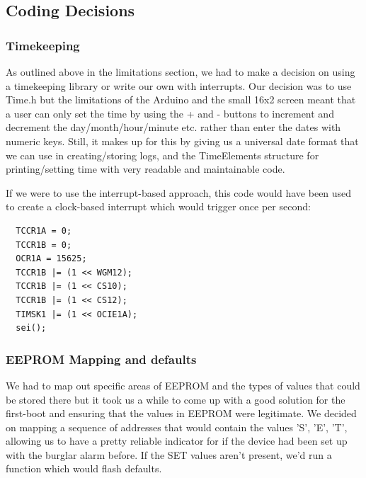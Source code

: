 \documentclass[a4paper,11pt]{article}
\theoremstyle{mytheor}
\begin{document}
\subsection{Coding Decisions}
\subsubsection{Timekeeping}
As outlined above in the limitations section, we had to make a decision on using a timekeeping library or write our own with interrupts. Our decision was to use {\selectfont Time.h} but the limitations of the Arduino and the small 16x2 screen meant that a user can only set the time by using the + and - buttons to increment and decrement the day/month/hour/minute etc. rather than enter the dates with numeric keys. Still, it makes up for this by giving us a universal date format that we can use in creating/storing logs, and the TimeElements structure for printing/setting time with very readable and maintainable code.

If we were to use the interrupt-based approach, this code would have been used to create a clock-based interrupt which would trigger once per second:
\begin{lstlisting}
  TCCR1A = 0;
  TCCR1B = 0;
  OCR1A = 15625;
  TCCR1B |= (1 << WGM12);
  TCCR1B |= (1 << CS10);
  TCCR1B |= (1 << CS12);
  TIMSK1 |= (1 << OCIE1A);
  sei();
\end{lstlisting}

\subsubsection{EEPROM Mapping and defaults}
We had to map out specific areas of EEPROM and the types of values that could be stored there but it took us a while to come up with a good solution for the first-boot and ensuring that the values in EEPROM were legitimate. We decided on mapping a sequence of addresses that would contain the values 'S', 'E', 'T', allowing us to have a pretty reliable indicator for if the device had been set up with the burglar alarm before. If the SET values aren't present, we'd run a function which would flash defaults.
\end{document}
